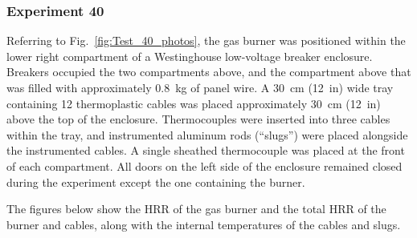 \clearpage

\subsubsection{Experiment 40}

Referring to Fig.~\ref{fig:Test_40_photos}, the gas burner was positioned within the lower right compartment of a Westinghouse low-voltage breaker enclosure. Breakers occupied the two compartments above, and the compartment above that was filled with approximately 0.8~kg of panel wire. A 30~cm (12~in) wide tray containing 12 thermoplastic cables was placed approximately 30~cm (12~in) above the top of the enclosure. Thermocouples were inserted into three cables within the tray, and instrumented aluminum rods (``slugs'') were placed alongside the instrumented cables. A single sheathed thermocouple was placed at the front of each compartment. All doors on the left side of the enclosure remained closed during the experiment except the one containing the burner.

The figures below show the HRR of the gas burner and the total HRR of the burner and cables, along with the internal temperatures of the cables and slugs.


